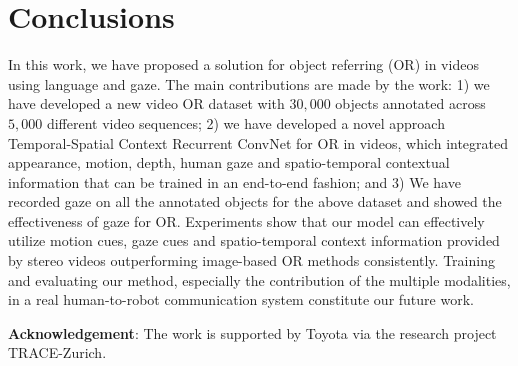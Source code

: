 \documentclass[10pt,twocolumn,letterpaper]{article}
\begin{document}

\section{Conclusions} 
\label{sec:conclusion}

In this work, we have proposed a solution for object referring (OR) in videos using language and gaze. The main contributions are made by the work: 1) we have developed a new video OR dataset with $30,000$ objects annotated across $5,000$ different video sequences; 2) we have developed a novel approach Temporal-Spatial Context Recurrent ConvNet for OR in videos, which integrated appearance, motion, depth, human gaze and spatio-temporal contextual information that can be trained in an end-to-end fashion; and 3) We have recorded gaze on all the annotated objects for the above dataset and showed the effectiveness of gaze for OR. 
Experiments show that our model can effectively utilize motion cues, gaze cues and spatio-temporal context information provided by stereo videos outperforming image-based OR methods consistently. Training and evaluating our method, especially the contribution of the multiple modalities, in a real human-to-robot communication system constitute our future work. 

\noindent
\textbf{Acknowledgement}: The work is supported by Toyota via the research project TRACE-Zurich.  

{\small


}
\end{document}
